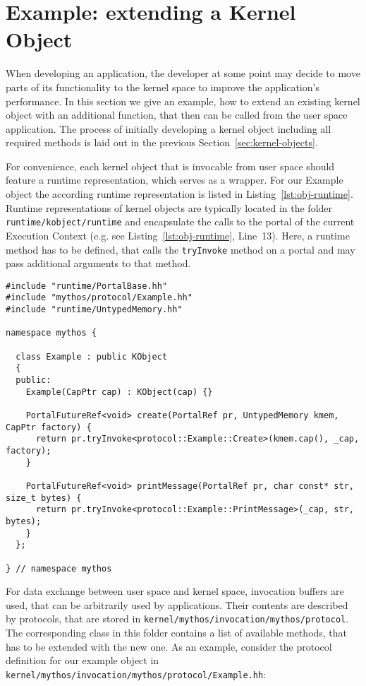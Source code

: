 \section{Example: extending a Kernel Object}
\label{sec:objects-example}

When developing an application, the developer at some point may decide to move
parts of its functionality to the kernel space to improve the application's
performance. In this section we give an example, how to extend an existing
kernel object with an additional function, that then can be called from the user space
application. The process of initially developing a kernel object including all
required methods is laid out in the previous Section~\ref{sec:kernel-objects}.

For convenience, each kernel object that is invocable from user space should
feature a runtime representation, which serves as a wrapper.  For our Example
object the according runtime representation is listed in
Listing~\ref{lst:obj-runtime}. Runtime representations of kernel objects are
typically located in the folder \texttt{runtime/kobject/runtime} and
encapsulate the calls to the portal of the current Execution Context (e.g. see
Listing~\ref{lst:obj-runtime}, Line~13). Here, a runtime method has to be
defined, that calls the \texttt{tryInvoke} method on a portal and may pass
additional arguments to that method.

\lstset{language=c++,caption=Object's Runtime Representation,label=lst:obj-runtime}
\begin{lstlisting}
#include "runtime/PortalBase.hh"
#include "mythos/protocol/Example.hh"
#include "runtime/UntypedMemory.hh"

namespace mythos {

  class Example : public KObject
  {
  public:
    Example(CapPtr cap) : KObject(cap) {}

    PortalFutureRef<void> create(PortalRef pr, UntypedMemory kmem, CapPtr factory) {
      return pr.tryInvoke<protocol::Example::Create>(kmem.cap(), _cap, factory);
    }

    PortalFutureRef<void> printMessage(PortalRef pr, char const* str, size_t bytes) {
      return pr.tryInvoke<protocol::Example::PrintMessage>(_cap, str, bytes);
    }
  };

} // namespace mythos
\end{lstlisting}

For data exchange between user space and kernel space, invocation buffers are
used, that can be arbitrarily used by applications. Their contents are
described by protocols, that are stored in
\texttt{kernel/mythos/invocation/mythos/protocol}. The corresponding class in
this folder contains a list of available methods, that has to be extended with
the new one. As an example, consider the protocol definition for our example object in
\texttt{kernel/mythos/invocation/mythos/protocol/Example.hh}:

